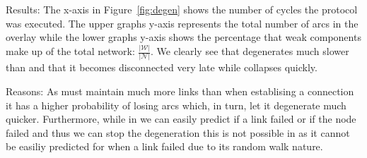 \begin{asparadesc}
\item[Results:]
    The x-axis in Figure~\ref{fig:degen} shows the number of cycles the protocol was
    executed.
    The upper graphs y-axis represents the total number of arcs in the
    overlay while the lower graphs y-axis shows the percentage that weak components
    make up of the total network: $\frac{|\mathcal{W}|}{|\mathcal{N}|}$.
    We clearly see that \SCAMPLON{} degenerates much slower than \SCAMP{} and that
    it becomes disconnected very late while \SCAMP{} collapses quickly.

\item[Reasons:]
    As \SCAMP{} must maintain much more links than \SCAMPLON{} when establising a
    connection it has a higher probability of losing arcs which, in turn, let it
    degenerate much quicker.
    Furthermore, while in \SCAMPLON{} we can easily predict if a link failed or if
    the node failed and thus we can stop the degeneration this is not possible in
    \SCAMP{} as it cannot be easiliy predicted for when a link failed due to its
    random walk nature.

\end{asparadesc}


